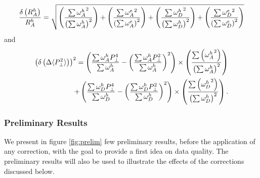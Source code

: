 \begin{equation}
{\delta \left ( R_A^h \right ) \over R_A^h} = 
      \sqrt{ \left ( {\sum {\omega^h_A}^2 \over \left (\sum \omega^h_A \right )^2} \right ) 
           + \left ( {\sum {\omega^e_A}^2 \over \left (\sum \omega^e_A \right )^2} \right ) 
           + \left ( {\sum {\omega^h_D}^2 \over \left (\sum \omega^h_D \right )^2} \right ) 
           + \left ( {\sum {\omega^e_D}^2 \over \left (\sum \omega^e_D \right )^2} \right ) }
\end{equation}
 and 
\begin{equation}
\begin{split}
\left ( \delta \left ( \Delta \langle P_\perp^2 \rangle \right ) \right )^2 = 
   \left ({{\sum \omega^h_A P_\perp^4 }\over{\sum \omega^h_A}} - \left ({\sum \omega^h_A P_\perp^2 }\over{\sum \omega^h_A}\right )^2 \right ) 
         \times \left ( {\sum \left ( {\omega^h_A}^2 \right ) \over \left ( \sum \omega^h_A \right ) ^2 }\right ) \\
 + \left ({{\sum \omega^h_D P_\perp^4 }\over{\sum \omega^h_D}} - \left ({\sum \omega^h_D P_\perp^2 }\over{\sum \omega^h_D}\right )^2 \right ) 
	 \times \left ( {\sum \left ( {\omega^h_D}^2 \right ) \over \left ( \sum \omega^h_D \right ) ^2 }\right ).
\end{split}
\end{equation}

\subsubsection{Preliminary Results}
\label{prelim}

We present in figure \ref{fig:prelim} few preliminary results, before the application of any correction, with the goal to 
provide a first idea on data quality. The preliminary results will also be used to 
illustrate the effects of the corrections discussed below.

